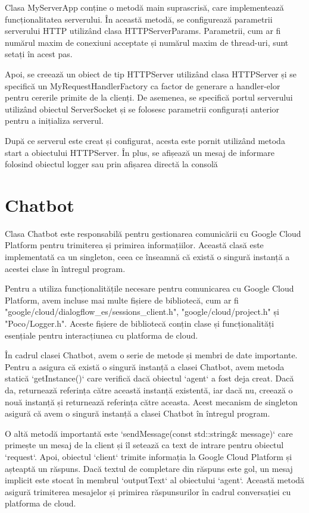 Clasa MyServerApp conține o metodă main suprascrisă, care implementează funcționalitatea serverului. În această metodă, se configurează parametrii serverului HTTP utilizând clasa HTTPServerParams. Parametrii, cum ar fi numărul maxim de conexiuni acceptate și numărul maxim de thread-uri, sunt setați în acest pas.

Apoi, se creează un obiect de tip HTTPServer utilizând clasa HTTPServer și se specifică un MyRequestHandlerFactory ca factor de generare a handler-elor pentru cererile primite de la clienți. De asemenea, se specifică portul serverului utilizând obiectul ServerSocket și se folosesc parametrii configurați anterior pentru a inițializa serverul.

După ce serverul este creat și configurat, acesta este pornit utilizând metoda start a obiectului HTTPServer. În plus, se afișează un mesaj de informare folosind obiectul logger sau prin afișarea directă la consolă

\section{Chatbot}

Clasa Chatbot este responsabilă pentru gestionarea comunicării cu Google Cloud Platform pentru trimiterea și primirea informațiilor. Această clasă este implementată ca un singleton, ceea ce înseamnă că există o singură instanță a acestei clase în întregul program.

Pentru a utiliza funcționalitățile necesare pentru comunicarea cu Google Cloud Platform, avem incluse mai multe fișiere de bibliotecă, cum ar fi "google/cloud/dialogflow\_es/sessions\_client.h", "google/cloud/project.h" și "Poco/Logger.h". Aceste fișiere de bibliotecă conțin clase și funcționalități esențiale pentru interacțiunea cu platforma de cloud.

În cadrul clasei Chatbot, avem o serie de metode și membri de date importante. Pentru a asigura că există o singură instanță a clasei Chatbot, avem metoda statică `getInstance()` care verifică dacă obiectul `agent` a fost deja creat. Dacă da, returnează referința către această instanță existentă, iar dacă nu, creează o nouă instanță și returnează referința către aceasta. Acest mecanism de singleton asigură că avem o singură instanță a clasei Chatbot în întregul program.

O altă metodă importantă este `sendMessage(const std::string\& message)` care primește un mesaj de la client și îl setează ca text de intrare pentru obiectul `request`. Apoi, obiectul `client` trimite informația la Google Cloud Platform și așteaptă un răspuns. Dacă textul de completare din răspuns este gol, un mesaj implicit este stocat în membrul `outputText` al obiectului `agent`. Această metodă asigură trimiterea mesajelor și primirea răspunsurilor în cadrul conversației cu platforma de cloud.


